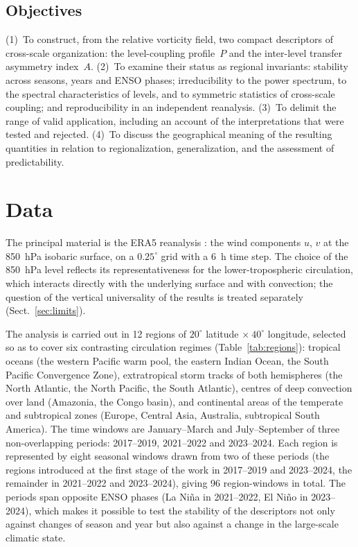 \documentclass[11pt,a4paper]{article}
\begin{document}
\subsection{Objectives}

(1)~To construct, from the relative vorticity field, two compact descriptors of cross-scale organization: the level-coupling profile~$P$ and the inter-level transfer asymmetry index~$A$. (2)~To examine their status as regional invariants: stability across seasons, years and ENSO phases; irreducibility to the power spectrum, to the spectral characteristics of levels, and to symmetric statistics of cross-scale coupling; and reproducibility in an independent reanalysis. (3)~To delimit the range of valid application, including an account of the interpretations that were tested and rejected. (4)~To discuss the geographical meaning of the resulting quantities in relation to regionalization, generalization, and the assessment of predictability.

\section{Data}
\label{sec:data}

The principal material is the ERA5 reanalysis \cite{Hersbach2020,Soci2024}: the wind components $u$, $v$ at the 850~hPa isobaric surface, on a $0.25^\circ$ grid with a 6~h time step. The choice of the 850~hPa level reflects its representativeness for the lower-tropospheric circulation, which interacts directly with the underlying surface and with convection; the question of the vertical universality of the results is treated separately (Sect.~\ref{sec:limits}).

The analysis is carried out in 12 regions of $20^\circ$ latitude $\times\ 40^\circ$ longitude, selected so as to cover six contrasting circulation regimes (Table~\ref{tab:regions}): tropical oceans (the western Pacific warm pool, the eastern Indian Ocean, the South Pacific Convergence Zone), extratropical storm tracks of both hemispheres (the North Atlantic, the North Pacific, the South Atlantic), centres of deep convection over land (Amazonia, the Congo basin), and continental areas of the temperate and subtropical zones (Europe, Central Asia, Australia, subtropical South America). The time windows are January--March and July--September of three non-overlapping periods: 2017--2019, 2021--2022 and 2023--2024. Each region is represented by eight seasonal windows drawn from two of these periods (the regions introduced at the first stage of the work in 2017--2019 and 2023--2024, the remainder in 2021--2022 and 2023--2024), giving 96 region-windows in total. The periods span opposite ENSO phases (La Ni\~na in 2021--2022, El Ni\~no in 2023--2024), which makes it possible to test the stability of the descriptors not only against changes of season and year but also against a change in the large-scale climatic state.
\end{document}
